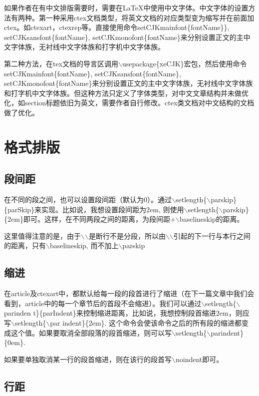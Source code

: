 \documentclass[12pt]{book}
\begin{document}
如果作者在有中文排版需要时，需要在\LaTeX{}中使用中文字体。中文字体的设置方法有两种。第一种采用ctex文档类型，将英文文档的对应类型变为缩写并在前面加ctex。如ctexart，ctexrep等。直接使用命令setCJKmainfont\{fontName\}\}, setCJKsansfont\{fontName\}, setCJKmonofont\{fontName\}来分别设置正文的主中文字体族，无衬线中文字体族和打字机中文字体族。

第二种方法，在tex文档的导言区调用$\backslash$usepackage\{xeCJK\}宏包，然后使用命令setCJKmainfont\{fontName\}, setCJKsansfont\{fontName\}, setCJKmonofont\{fontName\}来分别设置正文的主中文字体族，无衬线中文字体族和打字机中文字体族。但这种方法只定义了字体类型，对中文文章结构并未做优化，如section标题依旧为英文，需要作者自行修改。ctex类文档对中文结构的文档做了优化。

\chapter{格式排版}

\section{段间距}

在不同的段之间，也可以设置段间距（默认为0）。通过$\backslash$setlength\{$\backslash$parskip\}\{parSkip\}来实现。比如说，我想设置段间距为2em, 则使用$\backslash$setlength\{$\backslash$parskip\}\{2em\}即可。这样，在不同两段之间的距离，为段间距+$\backslash$baselineskip的距离。

这里值得注意的是，由于$\backslash$$\backslash$是断行不是分段，所以由$\backslash$$\backslash$引起的下一行与本行之间的距离，只有$\backslash$baselineskip, 而不加上$\backslash$parskip

\section{缩进}

在article及ctexart中，都默认给每一段的段首进行了缩进（在下一篇文章中我们会看到，article中的每一个章节后的首段不会缩进）。我们可以通过$\backslash$setlength\{$\backslash$parinden t\}\{parIndent\}来控制缩进距离，比如说，我想控制段首缩进2em，则应写$\backslash$setlength\{$\backslash$par indent\}\{2em\}. 这个命令会使该命令之后的所有段的缩进都变成这个值。如果要取消全部段落的段首缩进，则可以写$\backslash$setlength\{$\backslash$parindent\}\{0em\}.

如果要单独取消某一行的段首缩进，则在该行的段首写$\backslash$noindent即可。

\section{行距}
\end{document}
